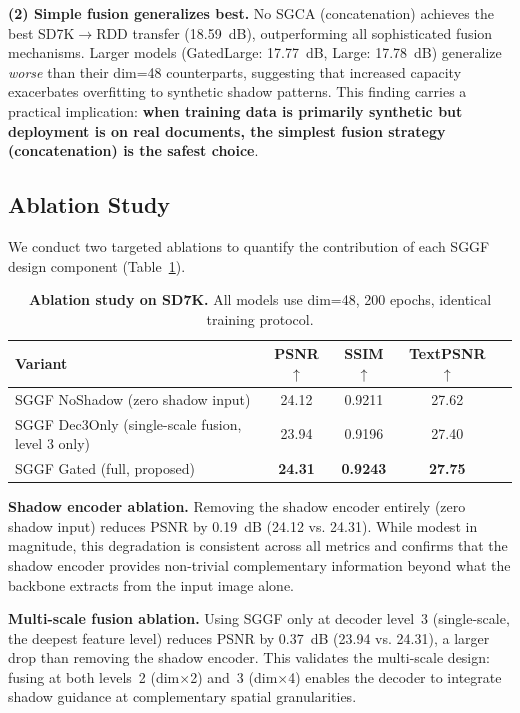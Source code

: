 \documentclass[11pt]{article}
\begin{document}
\textbf{(2) Simple fusion generalizes best.} No SGCA (concatenation) achieves the best SD7K$\rightarrow$RDD transfer (18.59~dB), outperforming all sophisticated fusion mechanisms.
Larger models (GatedLarge: 17.77~dB, Large: 17.78~dB) generalize \textit{worse} than their dim=48 counterparts, suggesting that increased capacity exacerbates overfitting to synthetic shadow patterns.
This finding carries a practical implication: \textbf{when training data is primarily synthetic but deployment is on real documents, the simplest fusion strategy (concatenation) is the safest choice}.

\subsection{Ablation Study}
\label{sec:ablation}

We conduct two targeted ablations to quantify the contribution of each SGGF design component (Table~\ref{tab:ablation}).

\begin{table}[t]
\centering
\caption{\textbf{Ablation study on SD7K.} All models use dim=48, 200 epochs, identical training protocol.}
\label{tab:ablation}
\begin{tabular}{@{}lcccc@{}}
\toprule
\textbf{Variant} & \textbf{PSNR$\uparrow$} & \textbf{SSIM$\uparrow$} & \textbf{TextPSNR$\uparrow$} \\
\midrule
SGGF NoShadow (zero shadow input) & 24.12 & 0.9211 & 27.62 \\
SGGF Dec3Only (single-scale fusion, level 3 only) & 23.94 & 0.9196 & 27.40 \\
\rowcolor{gray!15}
SGGF Gated (full, proposed) & \textbf{24.31} & \textbf{0.9243} & \textbf{27.75} \\
\bottomrule
\end{tabular}
\end{table}

\textbf{Shadow encoder ablation.} Removing the shadow encoder entirely (zero shadow input) reduces PSNR by 0.19~dB (24.12 vs. 24.31). While modest in magnitude, this degradation is consistent across all metrics and confirms that the shadow encoder provides non-trivial complementary information beyond what the backbone extracts from the input image alone.

\textbf{Multi-scale fusion ablation.} Using SGGF only at decoder level~3 (single-scale, the deepest feature level) reduces PSNR by 0.37~dB (23.94 vs. 24.31), a larger drop than removing the shadow encoder. This validates the multi-scale design: fusing at both levels~2 (dim$\times$2) and~3 (dim$\times$4) enables the decoder to integrate shadow guidance at complementary spatial granularities.
\end{document}
